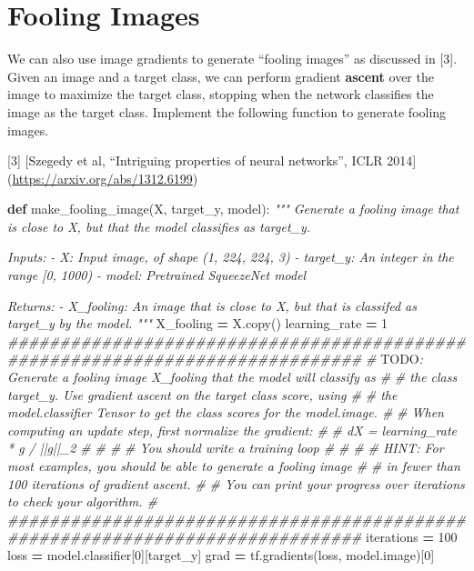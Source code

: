 \documentclass[]{book}
\newenvironment{Shaded}{\begin{snugshade}}{\end{snugshade}}
\newcommand{\KeywordTok}[1]{\textcolor[rgb]{0.13,0.29,0.53}{\textbf{#1}}}
\newcommand{\DecValTok}[1]{\textcolor[rgb]{0.00,0.00,0.81}{#1}}
\newcommand{\CommentTok}[1]{\textcolor[rgb]{0.56,0.35,0.01}{\textit{#1}}}
\newcommand{\OperatorTok}[1]{\textcolor[rgb]{0.81,0.36,0.00}{\textbf{#1}}}
\newcommand{\AlertTok}[1]{\textcolor[rgb]{0.94,0.16,0.16}{#1}}
\newcommand{\NormalTok}[1]{#1}
\theoremstyle{definition}
\theoremstyle{definition}
\theoremstyle{definition}
\theoremstyle{remark}
\begin{document}
\chapter{Fooling Images}\label{fooling-images}

We can also use image gradients to generate ``fooling images'' as
discussed in {[}3{]}. Given an image and a target class, we can perform
gradient \textbf{ascent} over the image to maximize the target class,
stopping when the network classifies the image as the target class.
Implement the following function to generate fooling images.

{[}3{]} {[}Szegedy et al, ``Intriguing properties of neural networks'',
ICLR 2014{]}(\url{https://arxiv.org/abs/1312.6199})

\begin{Shaded}
\begin{Highlighting}[]
\KeywordTok{def}\NormalTok{ make_fooling_image(X, target_y, model):}
    \CommentTok{"""}
\CommentTok{    Generate a fooling image that is close to X, but that the model classifies}
\CommentTok{    as target_y.}

\CommentTok{    Inputs:}
\CommentTok{    - X: Input image, of shape (1, 224, 224, 3)}
\CommentTok{    - target_y: An integer in the range [0, 1000)}
\CommentTok{    - model: Pretrained SqueezeNet model}

\CommentTok{    Returns:}
\CommentTok{    - X_fooling: An image that is close to X, but that is classifed as target_y}
\CommentTok{    by the model.}
\CommentTok{    """}
\NormalTok{    X_fooling }\OperatorTok{=}\NormalTok{ X.copy()}
\NormalTok{    learning_rate }\OperatorTok{=} \DecValTok{1}
    \CommentTok{##############################################################################}
    \CommentTok{# }\AlertTok{TODO}\CommentTok{: Generate a fooling image X_fooling that the model will classify as   #}
    \CommentTok{# the class target_y. Use gradient ascent on the target class score, using   #}
    \CommentTok{# the model.classifier Tensor to get the class scores for the model.image.   #}
    \CommentTok{# When computing an update step, first normalize the gradient:               #}
    \CommentTok{#   dX = learning_rate * g / ||g||_2                                         #}
    \CommentTok{#                                                                            #}
    \CommentTok{# You should write a training loop                                           #}
    \CommentTok{#                                                                            #  }
    \CommentTok{# HINT: For most examples, you should be able to generate a fooling image    #}
    \CommentTok{# in fewer than 100 iterations of gradient ascent.                           #}
    \CommentTok{# You can print your progress over iterations to check your algorithm.       #}
    \CommentTok{##############################################################################}
\NormalTok{    iterations }\OperatorTok{=} \DecValTok{100}
\NormalTok{    loss }\OperatorTok{=}\NormalTok{ model.classifier[}\DecValTok{0}\NormalTok{][target_y]}
\NormalTok{    grad }\OperatorTok{=}\NormalTok{ tf.gradients(loss, model.image)[}\DecValTok{0}\NormalTok{]}
    

\end{Highlighting}
\end{Shaded}
\end{document}
